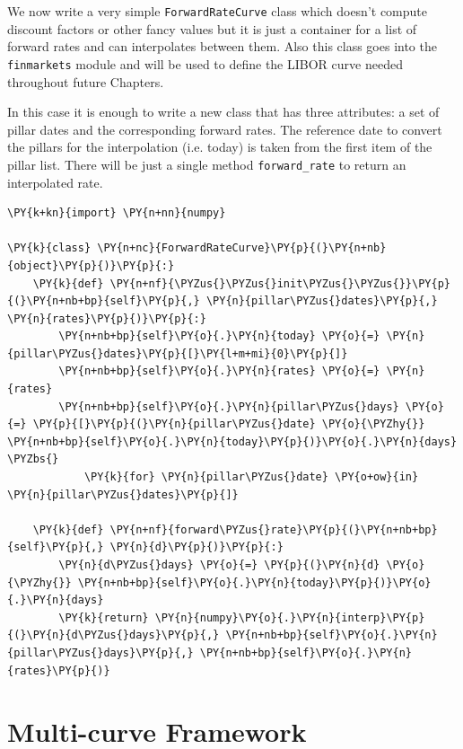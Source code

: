 We now write a very simple \texttt{ForwardRateCurve} class which doesn't compute 
discount factors or other fancy values but it is just a container for a list 
of forward rates and can interpolates between them.
Also this class goes into the \texttt{finmarkets} module and will be used to
define the LIBOR curve needed throughout future Chapters.

In this case it is enough to write a new class that has three attributes: 
a set of pillar dates and the corresponding forward rates. The reference date to convert 
the pillars for the interpolation (i.e. today) is taken from the first item of the pillar list.
There will be just a single method \texttt{forward\_rate} to return an interpolated rate.

\begin{codebox}[size=fbox, boxrule=1pt, colback=cellbackground, colframe=cellborder]
\begin{Verbatim}[commandchars=\\\{\}]
\PY{k+kn}{import} \PY{n+nn}{numpy}
	
\PY{k}{class} \PY{n+nc}{ForwardRateCurve}\PY{p}{(}\PY{n+nb}{object}\PY{p}{)}\PY{p}{:}	
    \PY{k}{def} \PY{n+nf}{\PYZus{}\PYZus{}init\PYZus{}\PYZus{}}\PY{p}{(}\PY{n+nb+bp}{self}\PY{p}{,} \PY{n}{pillar\PYZus{}dates}\PY{p}{,} \PY{n}{rates}\PY{p}{)}\PY{p}{:}
        \PY{n+nb+bp}{self}\PY{o}{.}\PY{n}{today} \PY{o}{=} \PY{n}{pillar\PYZus{}dates}\PY{p}{[}\PY{l+m+mi}{0}\PY{p}{]}
        \PY{n+nb+bp}{self}\PY{o}{.}\PY{n}{rates} \PY{o}{=} \PY{n}{rates}
        \PY{n+nb+bp}{self}\PY{o}{.}\PY{n}{pillar\PYZus{}days} \PY{o}{=} \PY{p}{[}\PY{p}{(}\PY{n}{pillar\PYZus{}date} \PY{o}{\PYZhy{}} \PY{n+nb+bp}{self}\PY{o}{.}\PY{n}{today}\PY{p}{)}\PY{o}{.}\PY{n}{days} \PYZbs{}
            \PY{k}{for} \PY{n}{pillar\PYZus{}date} \PY{o+ow}{in} \PY{n}{pillar\PYZus{}dates}\PY{p}{]}
	
    \PY{k}{def} \PY{n+nf}{forward\PYZus{}rate}\PY{p}{(}\PY{n+nb+bp}{self}\PY{p}{,} \PY{n}{d}\PY{p}{)}\PY{p}{:}
        \PY{n}{d\PYZus{}days} \PY{o}{=} \PY{p}{(}\PY{n}{d} \PY{o}{\PYZhy{}} \PY{n+nb+bp}{self}\PY{o}{.}\PY{n}{today}\PY{p}{)}\PY{o}{.}\PY{n}{days}
        \PY{k}{return} \PY{n}{numpy}\PY{o}{.}\PY{n}{interp}\PY{p}{(}\PY{n}{d\PYZus{}days}\PY{p}{,} \PY{n+nb+bp}{self}\PY{o}{.}\PY{n}{pillar\PYZus{}days}\PY{p}{,} \PY{n+nb+bp}{self}\PY{o}{.}\PY{n}{rates}\PY{p}{)}
\end{Verbatim}
\end{codebox}

\section{Multi-curve Framework}
\label{sec:financial-crisis}

